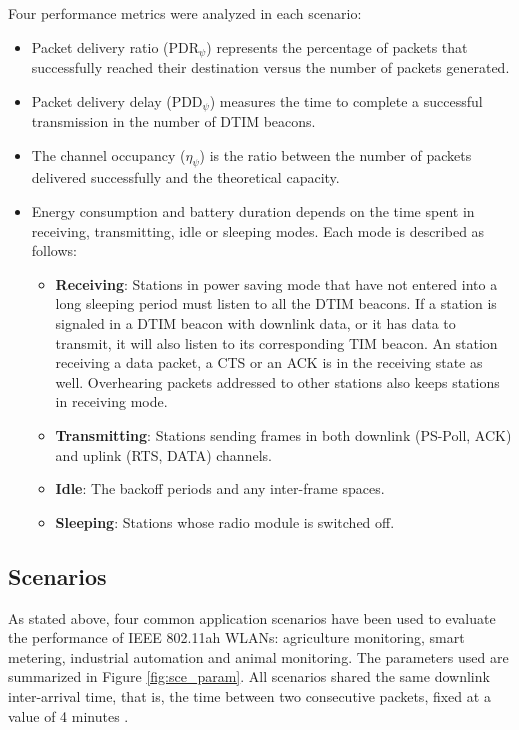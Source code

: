\documentclass[]{article}
\begin{document}
\renewcommand{\figurename}{Figure}


Four performance metrics were analyzed in each scenario:

\begin{itemize}
 \item Packet delivery ratio ($\text{PDR}_{\psi}$) represents the percentage of packets that successfully reached their destination versus the number of packets generated.


\item Packet delivery delay ($\text{PDD}_{\psi}$) measures the time to complete a successful transmission in the number of DTIM beacons.
 
\item The channel occupancy ($\eta_{\psi}$) is the ratio between the number of packets delivered successfully and the theoretical capacity.


\item Energy consumption and battery duration depends on the time spent in receiving, transmitting, idle or sleeping modes. Each mode is described as follows:


\begin{itemize}
\item \textbf{Receiving}: Stations in power saving mode that have not entered into a long sleeping period must listen to all the DTIM beacons. If a station is signaled in a DTIM beacon with downlink data, or it has data to transmit, it will also listen to its corresponding TIM beacon. An station receiving a data packet, a CTS or an ACK is in the receiving state as well. Overhearing packets addressed to other stations also keeps stations in receiving mode.
	\item \textbf{Transmitting}: Stations sending frames in both downlink (PS-Poll, ACK) and uplink (RTS, DATA) channels.
	\item \textbf{Idle}: The backoff periods and any inter-frame spaces.
	\item \textbf{Sleeping}: Stations whose radio module is switched off. 
\end{itemize}

\end{itemize}


\subsection{Scenarios}

As stated above, four common application scenarios have been used to evaluate the performance of IEEE 802.11ah WLANs: agriculture monitoring, smart metering, industrial automation and animal monitoring. The parameters used are summarized in Figure \ref{fig:sce_param}. All scenarios shared the same downlink inter-arrival time, that is, the time between two consecutive packets, fixed at a value of 4 minutes \cite{scoop} .
\end{document}
